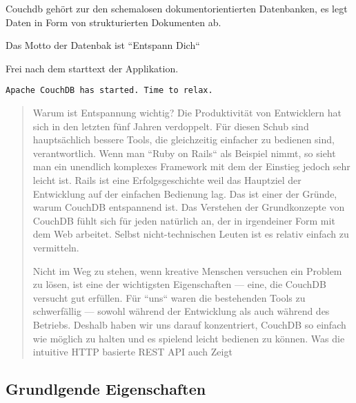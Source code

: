 Couchdb gehört zur den schemalosen dokumentorientierten Datenbanken,
es legt Daten in Form von strukturierten Dokumenten ab.

Das Motto der Datenbak ist ``Entspann Dich``

Frei nach dem starttext der Applikation.

\begin{verbatim}
Apache CouchDB has started. Time to relax.
\end{verbatim}


\begin{quote}
Warum ist Entspannung wichtig? Die Produktivität von Entwicklern hat sich in den letzten fünf Jahren verdoppelt.
Für diesen Schub sind hauptsächlich bessere Tools, die gleichzeitig einfacher zu bedienen sind, verantwortlich.
Wenn man ``Ruby on Rails`` als Beispiel nimmt, so sieht man ein unendlich komplexes Framework mit dem der Einstieg jedoch sehr leicht ist.
Rails ist eine Erfolgsgeschichte weil das Hauptziel der Entwicklung auf der einfachen Bedienung lag.
Das ist einer der Gründe, warum CouchDB entspannend ist.
Das Verstehen der Grundkonzepte von CouchDB fühlt sich für jeden natürlich an, der in irgendeiner Form mit dem Web arbeitet.
Selbst nicht-technischen Leuten ist es relativ einfach zu vermitteln.

Nicht im Weg zu stehen, wenn kreative Menschen versuchen ein Problem zu lösen, ist eine der wichtigsten Eigenschaften — eine,
die CouchDB versucht gut erfüllen. Für ``uns`` waren die bestehenden Tools zu schwerfällig — sowohl während der Entwicklung
als auch während des Betriebs. Deshalb haben wir uns darauf konzentriert,
CouchDB so einfach wie möglich zu halten und es spielend leicht bedienen zu können.
Was die intuitive HTTP basierte REST API auch Zeigt
\end{quote}
\cite[Deutsche Einführung]{couchdb:guide}


\subsection{Grundlgende Eigenschaften}


